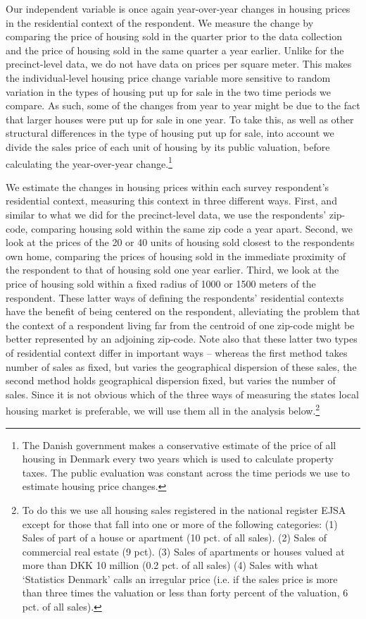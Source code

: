 \documentclass[12pt,a4paper]{article}
\begin{document}
	Our independent variable is once again year-over-year changes in housing prices in the residential context of the respondent. We measure the change by comparing the price of housing sold in the quarter prior to the data collection and the price of housing sold in the same quarter a year earlier. Unlike for the precinct-level data, we do not have data on prices per square meter. This makes the individual-level housing price change variable more sensitive to random variation in the types of housing put up for sale in the two time periods we compare. As such, some of the changes from year to year might be due to the fact that larger houses were put up for sale in one year. To take this, as well as other structural differences in the type of housing put up for sale, into account we divide the sales price of each unit of housing by its public valuation, before calculating the year-over-year change.\footnote{The Danish government makes a conservative estimate of the price of all housing in Denmark every two years which is used to calculate property taxes. The public evaluation was constant across the time periods we use to estimate housing price changes.}
	
	We estimate the changes in housing prices within each survey respondent's residential context, measuring this context in three different ways. First, and similar to what we did for the precinct-level data, we use the respondents’ zip-code, comparing housing sold within the same zip code a year apart. Second, we look at the prices of the 20 or 40 units of housing sold closest to the respondents own home, comparing the prices of housing sold in the immediate proximity of the respondent to that of housing sold one year earlier. Third, we look at the price of housing sold within a fixed radius of 1000 or 1500 meters of the respondent. These latter ways of defining the respondents’ residential contexts have the benefit of being centered on the respondent, alleviating the problem that the context of a respondent living far from the centroid of one zip-code might be better represented by an adjoining zip-code. Note also that these latter two types of residential context differ in important ways -- whereas the first method takes number of sales as fixed, but varies the geographical dispersion of these sales, the second method holds geographical dispersion fixed, but varies the number of sales. Since it is not obvious which of the three ways of measuring the states local housing market is preferable, we will use them all in the analysis below.\footnote{To do this we use all housing sales registered in the national register EJSA except for those that fall into one or more of the following categories: (1) Sales of part of a house or apartment (10 pct. of all sales). (2) Sales of commercial real estate (9 pct). (3) Sales of apartments or houses valued at more than DKK 10 million (0.2 pct. of all sales) (4) Sales with what `Statistics Denmark' calls an irregular price (i.e. if the sales price is more than three times the valuation or less than forty percent of the valuation, 6 pct. of all sales).}
	
\end{document}
